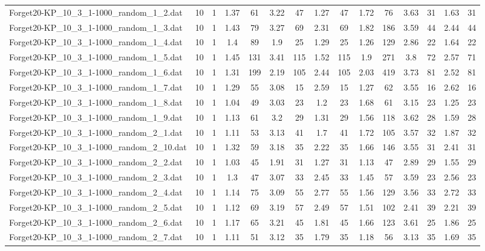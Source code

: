 \begin{table}[!ht]
{\begin{tabular}{lcccccccccccccc}
Forget20-KP\_10\_3\_1-1000\_random\_1\_2.dat & 10 & 1 & 1.37 & 61 & 3.22 & 47 & 1.27 & 47 & 1.72 & 76 & 3.63 & 31 & 1.63 & 31 \\
Forget20-KP\_10\_3\_1-1000\_random\_1\_3.dat & 10 & 1 & 1.43 & 79 & 3.27 & 69 & 2.31 & 69 & 1.82 & 186 & 3.59 & 44 & 2.44 & 44 \\
Forget20-KP\_10\_3\_1-1000\_random\_1\_4.dat & 10 & 1 & 1.4 & 89 & 1.9 & 25 & 1.29 & 25 & 1.26 & 129 & 2.86 & 22 & 1.64 & 22 \\
Forget20-KP\_10\_3\_1-1000\_random\_1\_5.dat & 10 & 1 & 1.45 & 131 & 3.41 & 115 & 1.52 & 115 & 1.9 & 271 & 3.8 & 72 & 2.57 & 71 \\
Forget20-KP\_10\_3\_1-1000\_random\_1\_6.dat & 10 & 1 & 1.31 & 199 & 2.19 & 105 & 2.44 & 105 & 2.03 & 419 & 3.73 & 81 & 2.52 & 81 \\
Forget20-KP\_10\_3\_1-1000\_random\_1\_7.dat & 10 & 1 & 1.29 & 55 & 3.08 & 15 & 2.59 & 15 & 1.27 & 62 & 3.55 & 16 & 2.62 & 16 \\
Forget20-KP\_10\_3\_1-1000\_random\_1\_8.dat & 10 & 1 & 1.04 & 49 & 3.03 & 23 & 1.2 & 23 & 1.68 & 61 & 3.15 & 23 & 1.25 & 23 \\
Forget20-KP\_10\_3\_1-1000\_random\_1\_9.dat & 10 & 1 & 1.13 & 61 & 3.2 & 29 & 1.31 & 29 & 1.56 & 118 & 3.62 & 28 & 1.59 & 28 \\
Forget20-KP\_10\_3\_1-1000\_random\_2\_1.dat & 10 & 1 & 1.11 & 53 & 3.13 & 41 & 1.7 & 41 & 1.72 & 105 & 3.57 & 32 & 1.87 & 32 \\
Forget20-KP\_10\_3\_1-1000\_random\_2\_10.dat & 10 & 1 & 1.32 & 59 & 3.18 & 35 & 2.22 & 35 & 1.66 & 146 & 3.55 & 31 & 2.41 & 31 \\
Forget20-KP\_10\_3\_1-1000\_random\_2\_2.dat & 10 & 1 & 1.03 & 45 & 1.91 & 31 & 1.27 & 31 & 1.13 & 47 & 2.89 & 29 & 1.55 & 29 \\
Forget20-KP\_10\_3\_1-1000\_random\_2\_3.dat & 10 & 1 & 1.3 & 47 & 3.07 & 33 & 2.45 & 33 & 1.45 & 57 & 3.59 & 23 & 2.56 & 23 \\
Forget20-KP\_10\_3\_1-1000\_random\_2\_4.dat & 10 & 1 & 1.14 & 75 & 3.09 & 55 & 2.77 & 55 & 1.56 & 129 & 3.56 & 33 & 2.72 & 33 \\
Forget20-KP\_10\_3\_1-1000\_random\_2\_5.dat & 10 & 1 & 1.12 & 69 & 3.19 & 57 & 2.49 & 57 & 1.51 & 102 & 2.41 & 39 & 2.21 & 39 \\
Forget20-KP\_10\_3\_1-1000\_random\_2\_6.dat & 10 & 1 & 1.17 & 65 & 3.21 & 45 & 1.81 & 45 & 1.66 & 123 & 3.61 & 25 & 1.86 & 25 \\
Forget20-KP\_10\_3\_1-1000\_random\_2\_7.dat & 10 & 1 & 1.11 & 51 & 3.12 & 35 & 1.79 & 35 & 1.18 & 56 & 3.13 & 35 & 1.69 & 35 \\

\end{tabular}}
\end{table}
